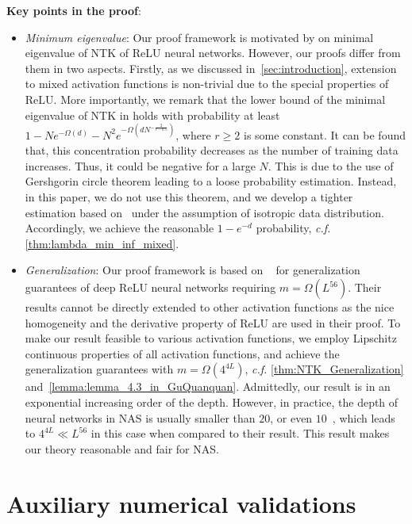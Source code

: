 \documentclass[nohyperref]{article}
\theoremstyle{plain}
\theoremstyle{definition}
\theoremstyle{remark}
\begin{document}
    
\textbf{Key points in the proof}:
\begin{itemize}
    \item \emph{Minimum eigenvalue}: Our proof framework is motivated by \citet{pmlr-v139-nguyen21g} on minimal eigenvalue of NTK of ReLU neural networks. However, our proofs differ from them in two aspects. Firstly, as we discussed in~\cref{sec:introduction}, extension to mixed activation functions is non-trivial due to the special properties of $\mathrm{ReLU}$. More importantly, we remark that the lower bound of the minimal eigenvalue of NTK in \citep[Theorem 3.2]{pmlr-v139-nguyen21g} holds with probability at least $1-N e^{-\Omega(d)} - N^2 e^{-\Omega\left(dN^{-\frac{2}{r-0.5}}\right)}$, where $r \geq 2$ is some constant.
    It can be found that, this concentration probability decreases as the number of training data increases. Thus, it could be negative for a large $N$.
    This is due to the use of Gershgorin circle theorem leading to a loose probability estimation. Instead, in this paper, we do not use this theorem, and we develop a tighter estimation based on~\citet{10.1214/ECP.v19-3807} under the assumption of isotropic data distribution. Accordingly, we achieve the reasonable $1- e^{-d}$ probability, \emph{c.f.} \cref{thm:lambda_min_inf_mixed}.
    \item \emph{Generalization}: Our proof framework is based on ~\citet{cao2019generalization} for generalization guarantees of deep ReLU neural networks requiring $m = \Omega(L^{56})$. Their results cannot be directly extended to other activation functions as the nice homogeneity and the derivative property of ReLU are used in their proof.
    To make our result feasible to various activation functions, we employ Lipschitz continuous properties of all activation functions, and achieve the generalization guarantees with $m = \Omega(4^{4L})$, \emph{c.f.} \cref{thm:NTK_Generalization} and~\cref{lemma:lemma_4.3_in_GuQuanquan}.
    Admittedly, our result is in an exponential increasing order of the depth. However, in practice, the depth of neural networks in NAS is usually smaller than $20$, or even $10$~\citep{liu2018hierarchical, dong2021nats}, which leads to $4^{4L} \ll L^{56}$ in this case when compared to their result.
    This result makes our theory reasonable and fair for NAS.
\end{itemize}

\section{Auxiliary numerical validations}
\label{sec:additional_experiments}
\end{document}
